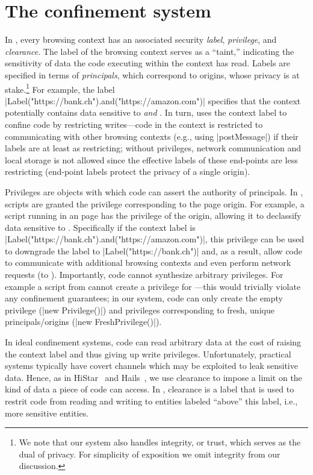 \section{The \sys{} confinement system}
\label{sec:system}

In \sys, every browsing context has an associated security \emph{label},
\emph{privilege}, and \emph{clearance}.
%
The label of the browsing context serves as a ``taint,'' indicating
the sensitivity of data the code executing within the context has
read.
%
Labels are specified in terms of \emph{principals}, which
correspond to origins, whose privacy is at stake.\footnote{
  We note that our system also handles integrity, or trust, which
  serves as the dual of privacy.
  For simplicity of exposition we omit integrity from our discussion.
}
%
For example, the label
\js|Label("https://bank.ch").and("https://amazon.com")| specifies that
the context potentially contains data sensitive to 
\emph{and} .
%
In turn, \sys{} uses the context label to confine code by restricting
writes---code in the context is restricted to communicating with other
browsing contexts (e.g., using \js|postMessage|) if their labels are at
least as restricting; without privileges, network communication and
local storage is not allowed since the effective labels of these
end-points are less restricting (end-point labels protect the privacy
of a single origin).

Privileges are objects with which code can assert the authority of
principals. 
%
In \sys, scripts are granted the privilege corresponding to the
page origin.
%
For example, a script running in an  page has the
privilege of the origin, allowing it to declassify data sensitive to
.
%
Specifically if the context label is
\js|Label("https://bank.ch").and("https://amazon.com")|, this privilege
can be used to downgrade the label to \js|Label("https://bank.ch")|
and, as a result, allow code to communicate with additional browsing
contexts and even perform network requests (to ).
%
Importantly, code cannot synthesize arbitrary privileges.
%
For example a  script from  cannot create a
privilege for ---this would trivially violate any
confinement guarantees;
%
in our system, code can only create the empty privilege
(\js|new Privilege()|) 
and privileges corresponding to fresh, unique principals/origins
(\js|new FreshPrivilege()|).

In ideal confinement systems, code can read arbitrary data at the cost
of raising the context label and thus giving up write privileges.
%
Unfortunately, practical systems typically have covert channels which
may be exploited to leak sensitive data.
%
Hence, as in HiStar~ and Hails~, we use
clearance to impose a limit on the kind of data a piece of code can
access.
%
In \sys, clearance is a label that is used to restrit code from
reading and writing to entities labeled ``above'' this label, i.e.,
more sensitive entities.

